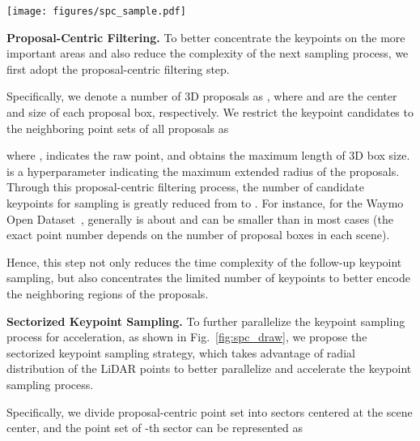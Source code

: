 \documentclass[natbib,twocolumn]{svjour3}          \smartqed  \usepackage{graphicx}
\begin{document}
\begin{figure*}
	\begin{center}
		\texttt{[image: figures/spc\_sample.pdf]}
	\end{center}
	\vspace{-4mm}
	\caption{Illustration of Sectorized Proposal-Centric (SPC) keypoint sampling. It contains two steps, where the first proposal filtering step concentrates the limited number of keypoints to the neighborhoods of proposals, and the following sectorized-FPS step divides the whole scene into several sectors for accelerating the keypoint sampling process while also keeping the keypoints uniformly distributed. }
	\label{fig:spc_draw}
\end{figure*}

\noindent
\textbf{Proposal-Centric Filtering.}
To better concentrate the keypoints on the more important areas and also reduce the complexity of the next sampling process, we first adopt the proposal-centric filtering step. 

Specifically, we denote a number of  3D proposals as , where  and  are the center and size of each proposal box, respectively. 
We restrict the keypoint candidates  to the neighboring point sets of all proposals as

where ,  indicates the raw point, and  obtains the maximum length of 3D box size. 
 is a hyperparameter indicating the maximum extended radius of the proposals.
Through this proposal-centric filtering process, the number of candidate keypoints for sampling is greatly reduced from  to . For instance, for the Waymo Open Dataset~\citep{Sun_2020_CVPR}, generally  is about  and  can be smaller than  in most cases (the exact point number depends on the number of proposal boxes in each scene).

Hence, this step not only reduces the time complexity of the follow-up keypoint sampling, but also concentrates the limited number of keypoints to better encode the neighboring regions of the proposals.



\noindent
\textbf{Sectorized Keypoint Sampling.}
To further parallelize the keypoint sampling process for acceleration, as shown in Fig.~\ref{fig:spc_draw}, we propose the sectorized keypoint sampling strategy, which takes advantage of radial distribution of the LiDAR points to better parallelize and accelerate the keypoint sampling process. 

Specifically, we divide proposal-centric point set  into  sectors centered at the scene center, and the point set of -th sector can be represented as
\end{document}
